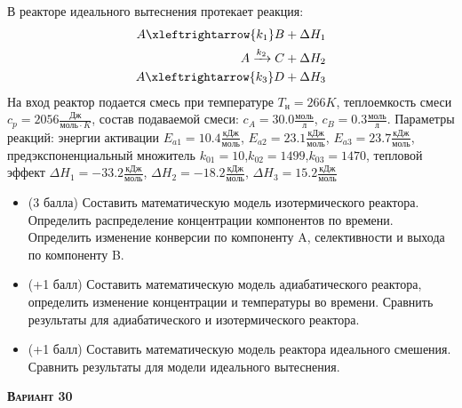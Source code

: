  В реакторе идеального вытеснения протекает реакция: \begin{equation*} \begin{aligned} A \xleftrightarrow{k_1} B + \Delta H_1 \\ A \xrightarrow{k_2} C + \Delta H_2 \\ A \xleftrightarrow{k_3} D + \Delta H_3 \end{aligned} \end{equation*} На вход  реактор подается смесь при температуре $ T_н =  266 K$, теплоемкость смеси $c_p= 2056 \frac{Дж}{моль \cdot K}$, состав подаваемой смеси: $c_A=30.0 \frac{моль}{л}$, $c_B=0.3 \frac{моль}{л}$. Параметры реакций: энергии активации $E_{a1}=10.4 \frac{кДж}{моль}$, $E_{a2}=23.1  \frac{кДж}{моль}$, $E_{a3}=23.7  \frac{кДж}{моль}$, предэкспоненциальный множитель $k_{01}=        10$,$k_{02}=      1499$,$k_{03}=      1470$, тепловой эффект $\Delta H_1= -33.2 \frac{кДж}{моль}$, $\Delta H_2=-18.2 \frac{кДж}{моль}$, $\Delta H_3 = 15.2 \frac{кДж}{моль}$\begin{itemize} \item (3 балла) Составить математическую модель изотермического реактора. Определить распределение концентрации компонентов по времени. Определить изменение конверсии по компоненту A, селективности и выхода по компоненту B. \item (+1 балл) Составить математическую модель адиабатического реактора, определить изменение концентрации и температуры во времени. Сравнить результаты для адиабатического и изотермического реактора. \item (+1 балл) Составить математическую модель реактора идеального смешения. Сравнить результаты для модели идеального вытеснения. \end{itemize}

\textsc{\textbf{Вариант 30}}

